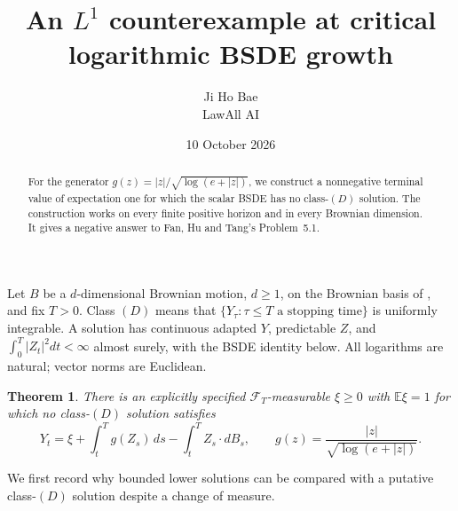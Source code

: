 \documentclass[11pt]{article}
\title{An $L^1$ counterexample at critical logarithmic BSDE growth}
\author{Ji Ho Bae\\\small LawAll AI}
\date{10 October 2026}
\newtheorem{theorem}{Theorem}
\newcommand{\E}{\mathbb E}
\newcommand{\F}{\mathcal F}
\begin{document}
\maketitle
\begin{abstract}
For the generator $g(z)=|z|/\sqrt{\log(e+|z|)}$, we construct a nonnegative
terminal value of expectation one for which the scalar BSDE has no
class-$(D)$ solution. The construction works on every finite positive
horizon and in every Brownian dimension. It gives a negative answer to
Fan, Hu and Tang's Problem~5.1.
\end{abstract}

Let $B$ be a $d$-dimensional Brownian motion, $d\geq1$, on the Brownian
basis of \cite{FHT}, and fix $T>0$. Class $(D)$ means that
$\{Y_\tau:\tau\leq T\text{ a stopping time}\}$ is uniformly integrable.
A solution has continuous adapted $Y$, predictable $Z$, and
$\int_0^T|Z_t|^2dt<\infty$ almost surely, with the BSDE identity below.
All logarithms are natural; vector norms are Euclidean.

\begin{theorem}\label{main}
There is an explicitly specified $\F_T$-measurable $\xi\geq0$ with
$\E\xi=1$ for which no class-$(D)$ solution satisfies
\begin{equation}\label{bsde}
 Y_t=\xi+\int_t^T g(Z_s)\,ds-\int_t^T Z_s\cdot dB_s,
 \qquad g(z)=\frac{|z|}{\sqrt{\log(e+|z|)}}.
\end{equation}
\end{theorem}

We first record why bounded lower solutions can be compared with a
putative class-$(D)$ solution despite a change of measure.
\end{document}
